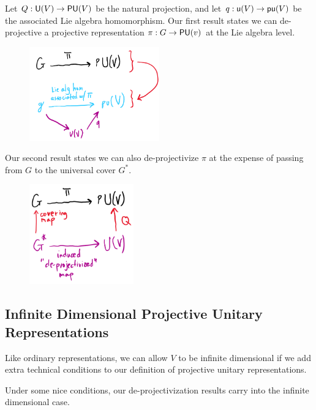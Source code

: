 Let $Q: \operatorname{\textsf{U}}(V) \rightarrow \operatorname{\textsf{PU}}(V)$ be the natural projection, and let $q: \operatorname{\textsf{u}}(V) \rightarrow \operatorname{\textsf{pu}}(V)$ be the associated Lie algebra homomorphism. Our first result states we can de-projective a projective representation $\pi: G \rightarrow \operatorname{\textsf{PU}}(v)$ at the Lie algebra level.

\begin{figure}[H]
    \includegraphics[width=0.5\textwidth]{figures/de-projectivization}
    \centering
\end{figure}

Our second result states we can also de-projectivize $\pi$ at the expense of passing from $G$ to the universal cover $G^*$.
\begin{figure}[H]
    \includegraphics[width=0.4\textwidth]{figures/de-projectivization2}
    \centering
\end{figure}

\subsection{Infinite Dimensional Projective Unitary Representations}
Like ordinary representations, we can allow $V$ to be infinite dimensional if we add extra technical conditions to our definition of projective unitary representations.

Under some nice conditions, our de-projectivization results carry into the infinite dimensional case.
